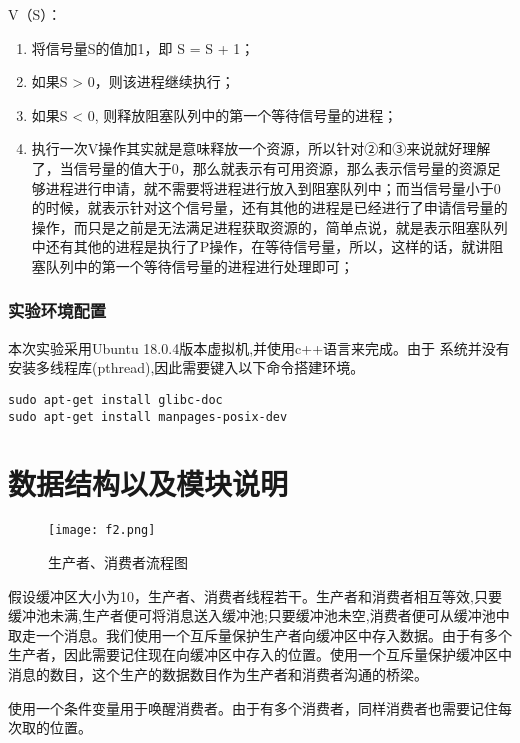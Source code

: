 \documentclass[withoutpreface,bwprint]{cumcmthesis} %
\begin{document}
V（S）：
\begin{enumerate}[itemindent=2em]  %
\item 将信号量S的值加1，即 S = S + 1； 
\item 如果S > 0，则该进程继续执行；	   
\item 如果S < 0, 则释放阻塞队列中的第一个等待信号量的进程；
\item 执行一次V操作其实就是意味释放一个资源，所以针对②和③来说就好理解了，当信号量的值大于0，那么就表示有可用资源，那么表示信号量的资源足够进程进行申请，就不需要将进程进行放入到阻塞队列中；而当信号量小于0的时候，就表示针对这个信号量，还有其他的进程是已经进行了申请信号量的操作，而只是之前是无法满足进程获取资源的，简单点说，就是表示阻塞队列中还有其他的进程是执行了P操作，在等待信号量，所以，这样的话，就讲阻塞队列中的第一个等待信号量的进程进行处理即可；
\end{enumerate}


\subsubsection{实验环境配置}

本次实验采用Ubuntu 18.0.4版本虚拟机,并使用c++语言来完成。由于
系统并没有安装多线程库(pthread),因此需要键入以下命令搭建环境。

\begin{lstlisting}
sudo apt-get install glibc-doc
sudo apt-get install manpages-posix-dev
\end{lstlisting}

\section{数据结构以及模块说明}

\begin{figure}[H]
	\centering
	\texttt{[image: f2.png]}
	\caption{ 生产者、消费者流程图 \label{fig:1}}
\end{figure}

假设缓冲区大小为10，生产者、消费者线程若干。生产者和消费者相互等效,只要缓冲池未满,生产者便可将消息送入缓冲池;只要缓冲池未空,消费者便可从缓冲池中取走一个消息。我们使用一个互斥量保护生产者向缓冲区中存入数据。由于有多个生产者，因此需要记住现在向缓冲区中存入的位置。使用一个互斥量保护缓冲区中消息的数目，这个生产的数据数目作为生产者和消费者沟通的桥梁。

使用一个条件变量用于唤醒消费者。由于有多个消费者，同样消费者也需要记住每次取的位置。
\end{document}
